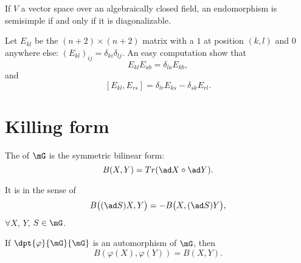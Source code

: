 \begin{proposition}
	If \( V\) a vector space over an algebraically closed field, an endomorphism is semisimple if and only if it is diagonalizable.
\end{proposition}

\label{pg:E_ij}Let $E_{kl}$ be the $(n+2)\times(n+2)$ matrix with a $1$ at position $(k,l)$ and $0$ anywhere else: $(E_{kl})_{ij}=\delta_{ki}\delta_{lj}$. An easy computation show that 
\begin{equation}        \label{EqFormMulEmtr}       %
	E_{kl}E_{ab}=\delta_{la}E_{kb},
\end{equation}
and
\begin{equation}\label{comm_de_E}
	[E_{kl},E_{rs}]=\delta_{lr}E_{ks}-\delta_{sk}E_{rl}.
\end{equation}

\section{Killing form}

\begin{definition}
	The  of $\mG$ is the symmetric bilinear form:
	\begin{equation}
		B(X,Y)=Tr(\ad X\circ \ad Y).
	\end{equation}
\end{definition}

\begin{proposition}
	It is  in the sense of
	\begin{equation}                        \label{eq:Killing_invariant}
		B\big((\ad S)X,Y\big)=-B\big(X,(\ad S)Y\big),
	\end{equation}
	$\forall X$, $Y$, $S\in\mG$.
\end{proposition}

\begin{proposition} \label{PropAutomInvarB}
	If $\dpt{\varphi}{\mG}{\mG}$ is an automorphism of $\mG$, then
	\[
		B(\varphi(X),\varphi(Y))=B(X,Y).
	\]
	\label{prop:auto_2}
\end{proposition}

